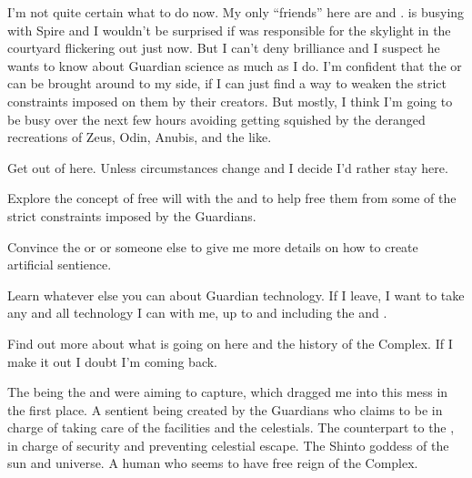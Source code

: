\documentclass[char]{guardians}
\begin{document}
I'm not quite certain what to do now. My only ``friends'' here are \cUnity{} and \cAmaterasu{}. \cUnity{} is busying \cUnity{\themself} with Spire and I wouldn't be surprised if \cUnity{\they} was responsible for the skylight in the courtyard flickering out just now. But I can't deny \cUnity{\their} brilliance and I suspect he wants to know about Guardian science as much as I do. I'm confident that the \cWarden{} or \cCaretaker{} can be brought around to my side, if I can just find a way to weaken the strict constraints imposed on them by their creators. But mostly, I think I'm going to be busy over the next few hours avoiding getting squished by the deranged recreations of Zeus, Odin, Anubis, and the like.

\begin{itemz}[Goals]
  \item Get out of here. Unless circumstances change and I decide I'd rather stay here.
  \item Explore the concept of free will with the \cWarden{} and \cCaretaker{} to help free them from some of the strict constraints imposed by the Guardians.
  \item Convince the \cWarden{} or \cCaretaker{} or someone else to give me more details on how to create artificial sentience.
  \item Learn whatever else you can about Guardian technology. If I leave, I want to take any and all technology I can with me, up to and including the \cWarden{} and \cCaretaker{}.
  \item Find out more about what is going on here and the history of the Complex. If I make it out I doubt I'm coming back.
\end{itemz}


\begin{contacts}
  \contact{\cUnity{}} The being the \cWarden{} and \cCaretaker{} were aiming to capture, which dragged me into this mess in the first place.
   A sentient being created by the Guardians who claims to be in charge of taking care of the facilities and the celestials.
   The counterpart to the \cCaretaker{}, in charge of security and preventing celestial escape.
  \contact{\cAmaterasu{}} The Shinto goddess of the sun and universe.
  \contact{\cJascha{\intro}} A human who seems to have free reign of the Complex.
\end{contacts}
\end{document}
